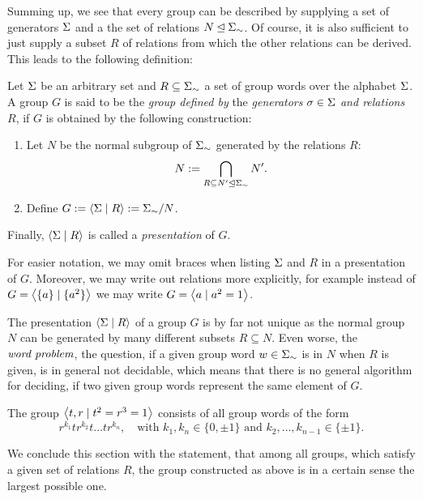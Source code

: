 Summing up, we see that every group can be described by supplying a set of generators $\Sigma$ and a the set of relations $N \unlhd {\Sigma}_{\sim}$. Of course, it is also sufficient to just supply a subset $R$ of relations from which the other relations can be derived. This leads to the following definition:

\begin{definition}
\label{dfn_GrpConstructGenRel}
Let $\Sigma$ be an arbitrary set and $R \subseteq {\Sigma}_{\sim}$ a set of group words over the alphabet $\Sigma$. A group $G$ is said to be the \emph{group defined by} the \emph{generators} $\sigma \in \Sigma$ \emph{and relations} $R$, if $G$ is obtained by the following construction:
\begin{enumerate}
\item Let $N$ be the normal subgroup of ${\Sigma}_{\sim}$ generated by the relations $R$:
\begin{equation*}
N := \bigcap_{R \subseteq N^{\prime} \unlhd {\Sigma}_{\sim}} N^{\prime}.
\end{equation*}
\item Define $G := \left\langle \Sigma \mid R \right\rangle := {\Sigma}_{\sim}/N$.
\end{enumerate}
Finally, $\left\langle \Sigma \mid R \right\rangle$ is called a \emph{presentation} of $G$.
\end{definition}

For easier notation, we may omit braces when listing $\Sigma$ and $R$ in a presentation of $G$. Moreover, we may write out relations more explicitly, for example instead of $G = \left\langle \{a\} \mid \{a^2\} \right\rangle$ we may write $G = \left\langle a \mid a^2 = 1 \right\rangle$.

\begin{remark}
The presentation $\left\langle \Sigma \mid R \right\rangle$ of a group $G$ is by far not unique as the normal group $N$ can be generated by many different subsets $R \subseteq N$. Even worse, the $\emph{word problem}$, \ie the question, if a given group word $w \in {\Sigma}_{\sim}$ is in $N$ when $R$ is given, is in general not decidable, which means that there is no general algorithm for deciding, if two given group words represent the same element of $G$.
\end{remark}

\begin{example}
The group $\left\langle t,r \mid t^2 = r^3 = 1 \right\rangle$ consists of all group words of the form
\begin{equation*}
\label{ex_RTGroup}
r^{k_1} t r^{k_2} t \dots t r^{k_n}, \quad 
\text {with } k_1, k_n \in \{0,\pm 1\} \text{ and } k_2, \dots, k_{n-1} \in \{\pm 1\}.
\end{equation*}
\end{example}
We conclude this section with the statement, that among all groups, which satisfy a given set of relations $R$, the group constructed as above is in a certain sense the largest possible one.


